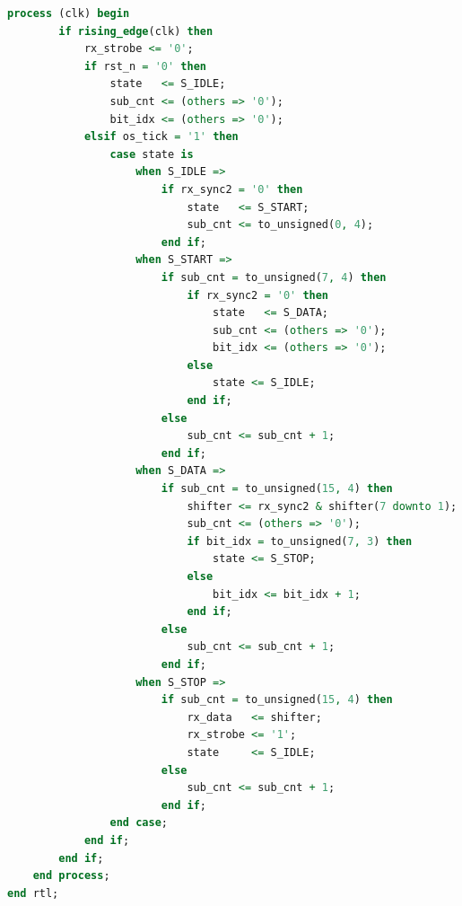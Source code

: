\documentclass[11pt,letterpaper]{article}
\begin{document}
\begin{lstlisting}[language=VHDL, caption={\texttt{uart\_rx.vhd} (Module~2) --- 115200~8N1 receiver, 16$\times$ oversampled, with \texttt{CLK\_FREQ\_HZ} and \texttt{BAUD} generics. Port list matches LH1-H exactly.}]
    process (clk) begin
        if rising_edge(clk) then
            rx_strobe <= '0';
            if rst_n = '0' then
                state   <= S_IDLE;
                sub_cnt <= (others => '0');
                bit_idx <= (others => '0');
            elsif os_tick = '1' then
                case state is
                    when S_IDLE =>
                        if rx_sync2 = '0' then
                            state   <= S_START;
                            sub_cnt <= to_unsigned(0, 4);
                        end if;
                    when S_START =>
                        if sub_cnt = to_unsigned(7, 4) then
                            if rx_sync2 = '0' then
                                state   <= S_DATA;
                                sub_cnt <= (others => '0');
                                bit_idx <= (others => '0');
                            else
                                state <= S_IDLE;
                            end if;
                        else
                            sub_cnt <= sub_cnt + 1;
                        end if;
                    when S_DATA =>
                        if sub_cnt = to_unsigned(15, 4) then
                            shifter <= rx_sync2 & shifter(7 downto 1);
                            sub_cnt <= (others => '0');
                            if bit_idx = to_unsigned(7, 3) then
                                state <= S_STOP;
                            else
                                bit_idx <= bit_idx + 1;
                            end if;
                        else
                            sub_cnt <= sub_cnt + 1;
                        end if;
                    when S_STOP =>
                        if sub_cnt = to_unsigned(15, 4) then
                            rx_data   <= shifter;
                            rx_strobe <= '1';
                            state     <= S_IDLE;
                        else
                            sub_cnt <= sub_cnt + 1;
                        end if;
                end case;
            end if;
        end if;
    end process;
end rtl;
\end{lstlisting}
\end{document}
